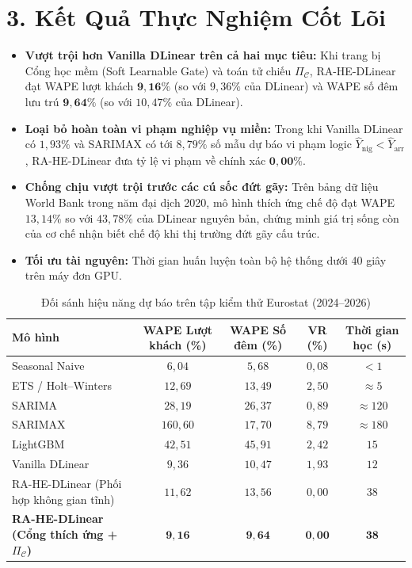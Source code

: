 \section*{3. Kết Quả Thực Nghiệm Cốt Lõi}
\begin{itemize}
    \item \textbf{Vượt trội hơn Vanilla DLinear trên cả hai mục tiêu:} Khi trang bị Cổng học mềm (Soft Learnable Gate) và toán tử chiếu $\Pi_{\mathcal{C}}$, RA-HE-DLinear đạt WAPE lượt khách $\mathbf{9{,}16\%}$ (so với $9{,}36\%$ của DLinear) và WAPE số đêm lưu trú $\mathbf{9{,}64\%}$ (so với $10{,}47\%$ của DLinear).
    \item \textbf{Loại bỏ hoàn toàn vi phạm nghiệp vụ miền:} Trong khi Vanilla DLinear có $1{,}93\%$ và SARIMAX có tới $8{,}79\%$ số mẫu dự báo vi phạm logic $\hat{Y}_{\text{nig}} < \hat{Y}_{\text{arr}}$, RA-HE-DLinear đưa tỷ lệ vi phạm về chính xác $\mathbf{0{,}00\%}$.
    \item \textbf{Chống chịu vượt trội trước các cú sốc đứt gãy:} Trên bảng dữ liệu World Bank trong năm đại dịch 2020, mô hình thích ứng chế độ đạt WAPE $13{,}14\%$ so với $43{,}78\%$ của DLinear nguyên bản, chứng minh giá trị sống còn của cơ chế nhận biết chế độ khi thị trường đứt gãy cấu trúc.
    \item \textbf{Tối ưu tài nguyên:} Thời gian huấn luyện toàn bộ hệ thống dưới 40 giây trên máy đơn GPU.
\end{itemize}

\begin{table}[H]
\centering
\caption{Đối sánh hiệu năng dự báo trên tập kiểm thử Eurostat (2024--2026)}
\label{tab:ieee_summary_table}
\begin{tabular}{lcccc}
\toprule
\textbf{Mô hình} & \textbf{WAPE Lượt khách (\%)} & \textbf{WAPE Số đêm (\%)} & \textbf{VR (\%)} & \textbf{Thời gian học (s)} \\
\midrule
Seasonal Naive & $6{,}04$ & $5{,}68$ & $0{,}08$ & $<1$ \\
ETS / Holt--Winters & $12{,}69$ & $13{,}49$ & $2{,}50$ & $\approx 5$ \\
SARIMA & $28{,}19$ & $26{,}37$ & $0{,}89$ & $\approx 120$ \\
SARIMAX & $160{,}60$ & $17{,}70$ & $8{,}79$ & $\approx 180$ \\
LightGBM & $42{,}51$ & $45{,}91$ & $2{,}42$ & $15$ \\
Vanilla DLinear & $9{,}36$ & $10{,}47$ & $1{,}93$ & $12$ \\
\midrule
RA-HE-DLinear (Phối hợp không gian tĩnh) & $11{,}62$ & $13{,}56$ & $0{,}00$ & $38$ \\
\textbf{RA-HE-DLinear (Cổng thích ứng + $\Pi_{\mathcal{C}}$)} & $\mathbf{9{,}16}$ & $\mathbf{9{,}64}$ & $\mathbf{0{,}00}$ & $\mathbf{38}$ \\
\bottomrule
\end{tabular}
\end{table}

